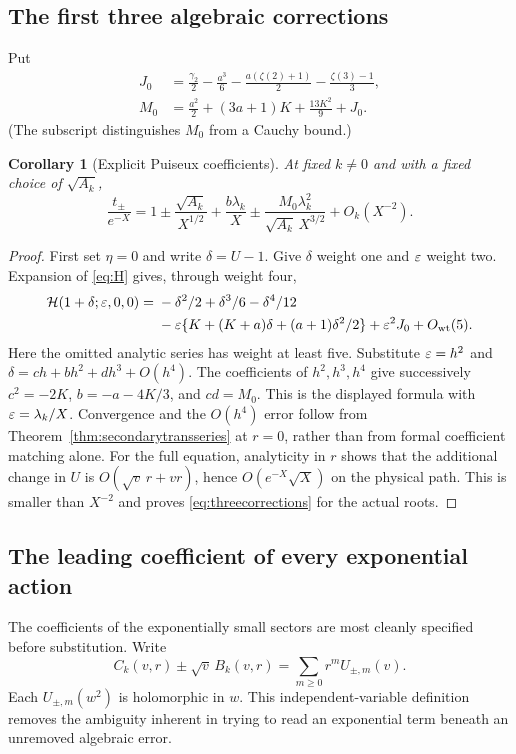 \documentclass[11pt,a4paper]{article}
\numberwithin{equation}{section}
\newtheorem{corollary}[theorem]{Corollary}
\theoremstyle{definition}\newtheorem{definition}[theorem]{Definition}
\theoremstyle{remark}\newtheorem{remark}[theorem]{Remark}
\newcommand{\HH}{\mathcal H}
\begin{document}
\subsection{The first three algebraic corrections}
Put
\begin{align}
 J_0&=\frac{\gamma_2}{2}-\frac{a^3}{6}
            -\frac{a(\zeta(2)+1)}2-\frac{\zeta(3)-1}{3},\label{eq:J0}\\
 M_0&=\frac{a^2}{2}+(3a+1)K+\frac{13K^2}{9}+J_0.\label{eq:M0}
\end{align}
(The subscript distinguishes $M_0$ from a Cauchy bound.)
\begin{corollary}[Explicit Puiseux coefficients]\label{cor:puiseux}
At fixed $k\ne0$ and with a fixed choice of $\sqrt{A_k}$,
\begin{equation}\label{eq:threecorrections}
 \frac{t_\pm}{e^{-X}}=
 1\pm\frac{\sqrt{A_k}}{X^{1/2}}+\frac{b\lambda_k}{X}
 \pm\frac{M_0\lambda_k^2}{\sqrt{A_k}\,X^{3/2}}
 +O_k(X^{-2}).
\end{equation}
\end{corollary}
\begin{proof}
First set $\eta=0$ and write $\delta=U-1$. Give $\delta$ weight one
and $\varepsilon$ weight two. Expansion of \eqref{eq:H} gives, through weight
four,
\begin{align*}
 \HH(1+\delta;\eps,0,0)
 ={}&-\delta^2/2+\delta^3/6-\delta^4/12\\
 &-\eps\{K+(K+a)\delta+(a+1)\delta^2/2\}
       +\eps^2J_0+O_{\mathrm{wt}}(5).
\end{align*}
Here the omitted analytic series has weight at least five. Substitute
$\varepsilon=h^2$ and $\delta=ch+bh^2+dh^3+O(h^4)$.
The coefficients of $h^2,h^3,h^4$ give successively
$c^2=-2K$, $b=-a-4K/3$, and $cd=M_0$. This is the displayed formula
with $\varepsilon=\lambda_k/X$. Convergence and the $O(h^4)$ error follow
from Theorem~\ref{thm:secondarytransseries} at $r=0$, rather than from
formal coefficient matching alone.
For the full equation, analyticity in $r$ shows that the additional
change in $U$ is $O(\sqrt v\,r+v r)$, hence
$O(e^{-X}\sqrt X)$ on the physical path. This is smaller than $X^{-2}$
and proves \eqref{eq:threecorrections} for the actual roots.
\end{proof}

\subsection{The leading coefficient of every exponential action}
The coefficients of the exponentially small sectors are most cleanly
specified before substitution. Write
\begin{equation}\label{eq:sectorfunctions}
 C_k(v,r)\pm\sqrt v\,B_k(v,r)
          =\sum_{m\ge0}r^m U_{\pm,m}(v).
\end{equation}
Each $U_{\pm,m}(w^2)$ is holomorphic in $w$. This independent-variable
definition removes the ambiguity inherent in trying to read an exponential
term beneath an unremoved algebraic error.
\end{document}
